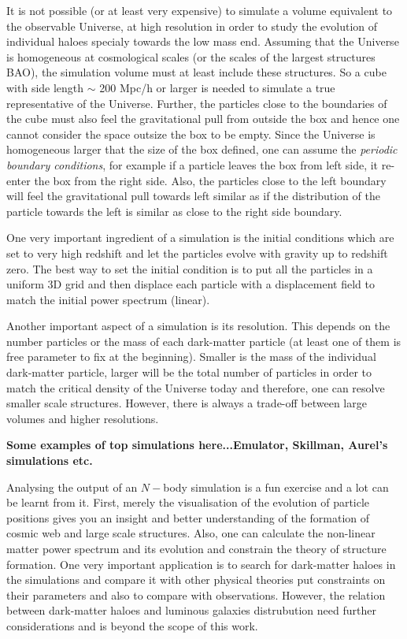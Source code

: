 It is not possible (or at least very expensive) to simulate a volume equivalent to the
observable Universe, at high resolution in order to study the evolution of individual
haloes specialy towards the low mass end. Assuming that the Universe is homogeneous
at cosmological scales (or the scales of the largest structures BAO), the simulation
volume must at least include these structures. So a cube with side length $\sim$ 200 Mpc/h
or larger is needed to simulate a true representative of the Universe. Further, the
particles close to the boundaries of the cube must also feel the gravitational pull
from outside the box and hence one cannot consider the space outsize the box to be 
empty. Since the Universe is homogeneous larger that the size of the box defined, one
can assume the {\it periodic boundary conditions}, for example if a particle leaves the box from left
side, it re-enter the box from the right side. Also, the particles close to the left boundary
will feel the gravitational pull towards left similar as if the distribution of the particle
towards the left is similar as close to the right side boundary.

One very important ingredient of a simulation is the initial conditions which are
set to very high redshift and let the particles evolve with gravity up to redshift zero. 
The best way to set the initial condition is to put all the particles in a uniform 3D grid
and then displace each particle with a displacement field to match the initial power 
spectrum (linear). 

Another important aspect of a simulation is its resolution. This depends on the number 
particles or the mass of each dark-matter particle (at least one of them is free parameter 
to fix at the beginning). Smaller is the mass of the individual dark-matter particle, 
larger will be the total number of particles in order to match the critical density of 
the Universe today and therefore, one can resolve smaller scale structures. However, 
there is always a trade-off between large volumes and higher resolutions. 

{\bf Some examples of top simulations here...Emulator, Skillman, Aurel's simulations etc.} 

Analysing the output of an $N-$body simulation is a fun exercise and a lot can be learnt
from it. First, merely the visualisation of the evolution of particle positions gives
you an insight and better understanding of the formation of cosmic web and large
scale structures. Also, one can calculate the non-linear matter power spectrum and its
evolution and constrain the theory of structure formation. One very important
application is to search for dark-matter haloes in the simulations and compare
it with other physical theories put constraints on their parameters and also
to compare with observations. However, the relation between dark-matter haloes
and luminous galaxies distrubution need further considerations and is beyond
the scope of this work. 

